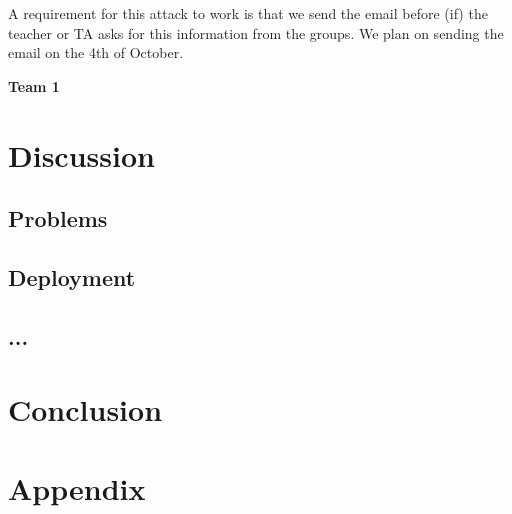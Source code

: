 \documentclass[a4paper]{article}
\begin{document}
A requirement for this attack to work is that we send the email before (if) the teacher or TA asks for this information from the groups. We plan on sending the email on the 4th of October.


\textbf{Team 1}



\section{Discussion}
\subsection{Problems}
\subsection{Deployment}

\subsection{...}


\section{Conclusion}

\section{Appendix}

\end{document}
